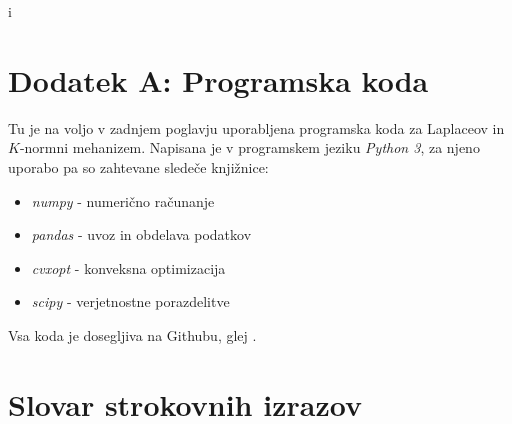 i\documentclass[mat1]{fmfdelo}
\begin{document}
\section*{Dodatek A: Programska koda} \label{appcode}

Tu je na voljo v zadnjem poglavju uporabljena programska koda za Laplaceov in $K$-normni mehanizem. Napisana je v programskem jeziku \emph{Python 3}, za njeno uporabo pa so zahtevane sledeče knjižnice:
\begin{itemize}
    \item \emph{numpy} - numerično računanje
    \item \emph{pandas} - uvoz in obdelava podatkov
    \item \emph{cvxopt} - konveksna optimizacija
    \item \emph{scipy} - verjetnostne porazdelitve
\end{itemize}
Vsa koda je dosegljiva na Githubu, glej \cite{github}. \\ 




\section*{Slovar strokovnih izrazov}


\end{document}
